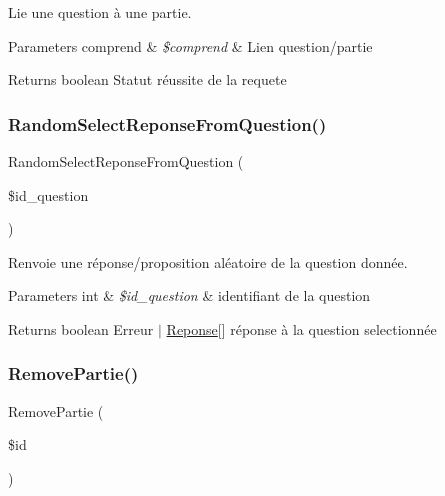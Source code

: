 Lie une question à une partie. 


\begin{DoxyParams}[1]{Parameters}
comprend & {\em \$comprend} & Lien question/partie\\
\hline
\end{DoxyParams}
\begin{DoxyReturn}{Returns}
boolean Statut réussite de la requete 
\end{DoxyReturn}
\mbox{\label{class_interface_b_d_d_a0ef10a6954ec4add81d8a602bb70bd03}} 
\subsubsection{\texorpdfstring{Random\+Select\+Reponse\+From\+Question()}{RandomSelectReponseFromQuestion()}}
{\footnotesize\ttfamily Random\+Select\+Reponse\+From\+Question (\begin{DoxyParamCaption}\item[{}]{\$id\+\_\+question }\end{DoxyParamCaption})}



Renvoie une réponse/proposition aléatoire de la question donnée. 


\begin{DoxyParams}[1]{Parameters}
int & {\em \$id\+\_\+question} & identifiant de la question\\
\hline
\end{DoxyParams}
\begin{DoxyReturn}{Returns}
boolean Erreur $\vert$ \mbox{\hyperlink{class_reponse}{Reponse}}\mbox{[}\mbox{]} réponse à la question selectionnée 
\end{DoxyReturn}
\mbox{\label{class_interface_b_d_d_a3981553b34d86dc1419002f9a9121fc6}} 
\subsubsection{\texorpdfstring{Remove\+Partie()}{RemovePartie()}}
{\footnotesize\ttfamily Remove\+Partie (\begin{DoxyParamCaption}\item[{}]{\$id }\end{DoxyParamCaption})}



